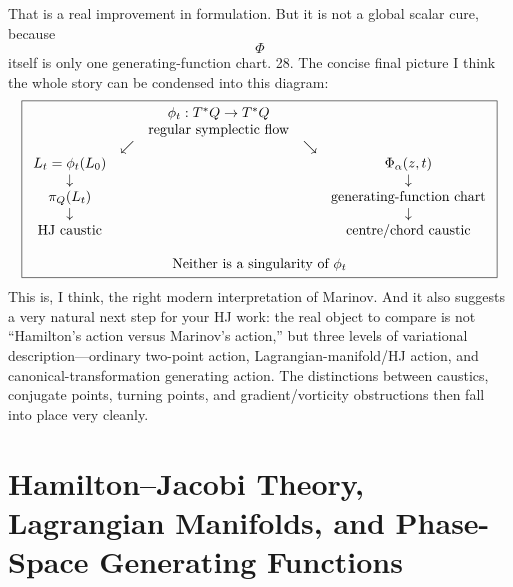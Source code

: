 That is a real improvement in formulation.
But it is not a global scalar cure, because
$$ \Phi $$
itself is only one generating-function chart.
28. The concise final picture
I think the whole story can be condensed into this diagram:
$$ \boxed{ \begin{array}{ccccc} &&\phi_t:T^*Q\to T^*Q&&\\ &&\text{regular symplectic flow}&&\\ &\swarrow&&\searrow&\\ L_t=\phi_t(L_0)&&&&\Phi_\alpha(z,t)\\ \downarrow&&&&\downarrow\\ \pi_Q(L_t)&&&&\text{generating-function chart}\\ \downarrow&&&&\downarrow\\ \text{HJ caustic}&&&& \text{centre/chord caustic}\\ &&&&\\ \multicolumn{5}{c}{ \text{Neither is a singularity of }\phi_t } \end{array}} $$
This is, I think, the right modern interpretation of Marinov.
And it also suggests a very natural next step for your HJ work: the real object to compare is not “Hamilton's action versus Marinov's action,” but three levels of variational description—ordinary two-point action, Lagrangian-manifold/HJ action, and canonical-transformation generating action. The distinctions between caustics, conjugate points, turning points, and gradient/vorticity obstructions then fall into place very cleanly.
\section{Hamilton--Jacobi Theory, Lagrangian Manifolds, and Phase-Space Generating Functions}
